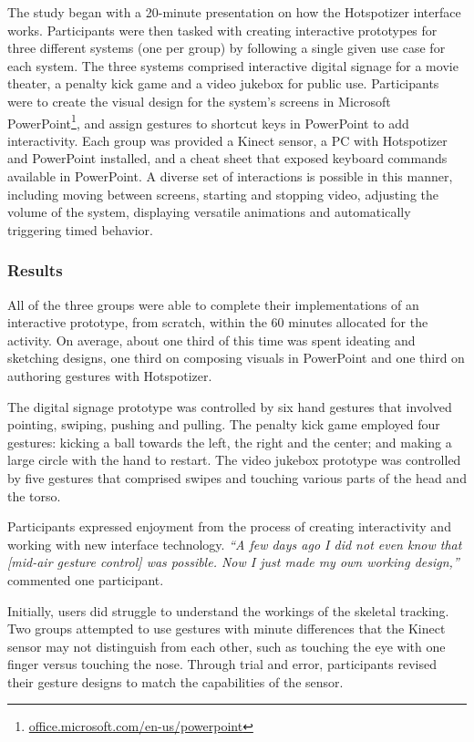 The study began with a 20-minute presentation on how the Hotspotizer interface works. Participants were then tasked with creating interactive prototypes for three different systems (one per group) by following a single given use case for each system. The three systems comprised interactive digital signage for a movie theater, a penalty kick game and a video jukebox for public use. Participants were to create the visual design for the system’s screens in Microsoft PowerPoint\footnote{\href{http://office.microsoft.com/en-us/powerpoint/}{office.microsoft.com/en-us/powerpoint}}, and assign gestures to shortcut keys in PowerPoint to add interactivity. Each group was provided a Kinect sensor, a PC with Hotspotizer and PowerPoint installed, and a cheat sheet that exposed keyboard commands available in PowerPoint. A diverse set of interactions is possible in this manner, including moving between screens, starting and stopping video, adjusting the volume of the system, displaying versatile animations and automatically triggering timed behavior.

\subsubsection{Results}

All of the three groups were able to complete their implementations of an interactive prototype, from scratch, within the 60 minutes allocated for the activity. On average, about one third of this time was spent ideating and sketching designs, one third on composing visuals in PowerPoint and one third on authoring gestures with Hotspotizer.

The digital signage prototype was controlled by six hand gestures that involved pointing, swiping, pushing and pulling. The penalty kick game employed four gestures: kicking a ball towards the left, the right and the center; and making a large circle with the hand to restart. The video jukebox prototype was controlled by five gestures that comprised swipes and touching various parts of the head and the torso.

Participants expressed enjoyment from the process of creating interactivity and working with new interface technology. \emph{“A few days ago I did not even know that [mid-air gesture control] was possible. Now I just made my own working design,”} commented one participant.

Initially, users did struggle to understand the workings of the skeletal tracking. Two groups attempted to use gestures with minute differences that the Kinect sensor may not distinguish from each other, such as touching the eye with one finger versus touching the nose. Through trial and error, participants revised their gesture designs to match the capabilities of the sensor.

